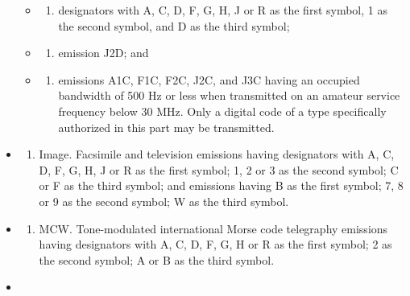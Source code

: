 \documentclass[
  letterpaper,
  DIV=11,
  numbers=noendperiod]{scrreport}
\providecommand{\tightlist}{%
  \setlength{\itemsep}{0pt}\setlength{\parskip}{0pt}}\usepackage{longtable,booktabs,array}
\begin{document}
\begin{itemize}
  \begin{itemize}
  \item
    \begin{enumerate}
    \def\labelenumi{(\roman{enumi})}
    \tightlist
    \item
      designators with A, C, D, F, G, H, J or R as the first symbol, 1
      as the second symbol, and D as the third symbol;
    \end{enumerate}
  \item
    \begin{enumerate}
    \def\labelenumi{(\roman{enumi})}
    \setcounter{enumi}{1}
    \tightlist
    \item
      emission J2D; and
    \end{enumerate}
  \item
    \begin{enumerate}
    \def\labelenumi{(\roman{enumi})}
    \setcounter{enumi}{2}
    \tightlist
    \item
      emissions A1C, F1C, F2C, J2C, and J3C having an occupied bandwidth
      of 500 Hz or less when transmitted on an amateur service frequency
      below 30 MHz. Only a digital code of a type specifically
      authorized in this part may be transmitted.
    \end{enumerate}
  \end{itemize}
\item
  \begin{enumerate}
  \def\labelenumi{(\arabic{enumi})}
  \setcounter{enumi}{2}
  \tightlist
  \item
    Image. Facsimile and television emissions having designators with A,
    C, D, F, G, H, J or R as the first symbol; 1, 2 or 3 as the second
    symbol; C or F as the third symbol; and emissions having B as the
    first symbol; 7, 8 or 9 as the second symbol; W as the third symbol.
  \end{enumerate}
\item
  \begin{enumerate}
  \def\labelenumi{(\arabic{enumi})}
  \setcounter{enumi}{3}
  \tightlist
  \item
    MCW. Tone-modulated international Morse code telegraphy emissions
    having designators with A, C, D, F, G, H or R as the first symbol; 2
    as the second symbol; A or B as the third symbol.
  \end{enumerate}
\item
  \begin{enumerate}
  \def\labelenumi{(\arabic{enumi})}
  \setcounter{enumi}{4}

\end{enumerate}
\end{itemize}
\end{document}
